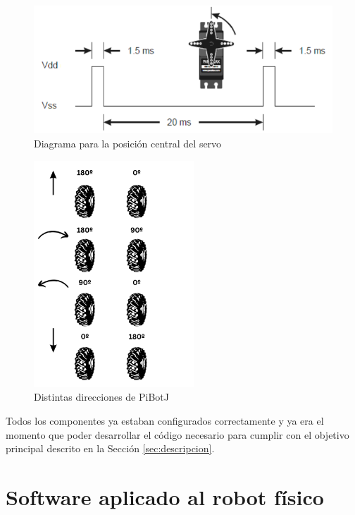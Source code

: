 \begin{figure} [h!]
	\begin{center}
		\includegraphics[width=12cm]{figs/cap6/pwm.png}
	\end{center}
	\caption{Diagrama para la posición central del servo}
	\label{fig:pwm}
\end{figure}

 \begin{figure} [h!]
	\begin{center}
		\includegraphics[width=6cm]{figs/cap6/motorlogic.png}
	\end{center}
	\caption{Distintas direcciones de PiBotJ}
	\label{fig:motorlogic}
\end{figure}

Todos los componentes ya estaban configurados correctamente y ya era el momento que poder desarrollar el código necesario para cumplir con el objetivo principal descrito en la Sección \ref{sec:descripcion}.


\section{Software aplicado al robot físico}
\label{sec:softwarerf}

